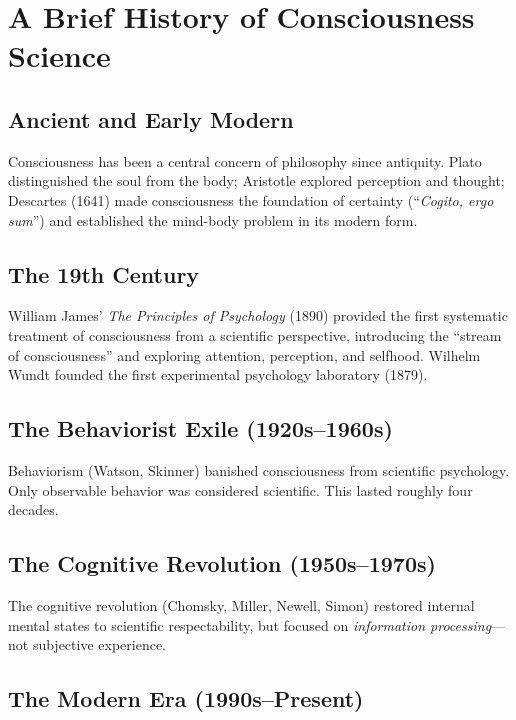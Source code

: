 \documentclass[11pt,a4paper]{report}
\begin{document}
\chapter{A Brief History of Consciousness Science}

\section{Ancient and Early Modern}

Consciousness has been a central concern of philosophy since antiquity. Plato distinguished the soul from the body; Aristotle explored perception and thought; Descartes (1641) made consciousness the foundation of certainty (``\emph{Cogito, ergo sum}'') and established the mind-body problem in its modern form.

\section{The 19th Century}

William James' \textit{The Principles of Psychology} (1890) provided the first systematic treatment of consciousness from a scientific perspective, introducing the ``stream of consciousness'' and exploring attention, perception, and selfhood. Wilhelm Wundt founded the first experimental psychology laboratory (1879).

\section{The Behaviorist Exile (1920s--1960s)}

Behaviorism (Watson, Skinner) banished consciousness from scientific psychology. Only observable behavior was considered scientific. This lasted roughly four decades.

\section{The Cognitive Revolution (1950s--1970s)}

The cognitive revolution (Chomsky, Miller, Newell, Simon) restored internal mental states to scientific respectability, but focused on \emph{information processing}---not subjective experience.

\section{The Modern Era (1990s--Present)}
\end{document}
